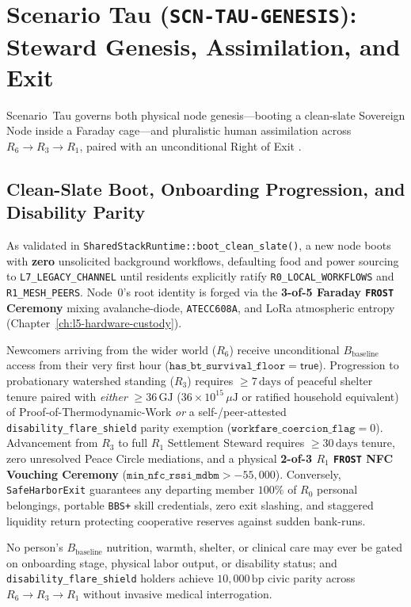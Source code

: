 \section{Scenario Tau (\texttt{SCN-TAU-GENESIS}): Steward Genesis, Assimilation, and Exit}
\label{sec:wavea-tau}

Scenario~Tau governs both physical node genesis---booting a clean-slate Sovereign Node inside a
Faraday cage---and pluralistic human assimilation across $R_6 \to R_3 \to R_1$, paired with an
unconditional Right of Exit \parencite{hirschman1970}.

\subsection{Clean-Slate Boot, Onboarding Progression, and Disability Parity}

As validated in \texttt{SharedStackRuntime::boot\_clean\_slate()}, a new node boots with
\textbf{zero} unsolicited background workflows, defaulting food and power sourcing to
\texttt{L7\_LEGACY\_CHANNEL} until residents explicitly ratify \texttt{R0\_LOCAL\_WORKFLOWS} and
\texttt{R1\_MESH\_PEERS}. Node~0's root identity is forged via the \textbf{3-of-5 Faraday \texttt{FROST}
Ceremony} mixing avalanche-diode, \texttt{ATECC608A}, and LoRa atmospheric entropy (Chapter~\ref{ch:l5-hardware-custody}).

Newcomers arriving from the wider world ($R_6$) receive unconditional $B_{\mathrm{baseline}}$ access
from their very first hour ($\mathtt{has\_bt\_survival\_floor} = \mathsf{true}$). Progression to
probationary watershed standing ($R_3$) requires $\ge 7\,\mathrm{days}$ of peaceful shelter tenure
paired with \textit{either} $\ge 36\,\mathrm{GJ}$ ($36 \times 10^{15}\,\mu\mathrm{J}$ or ratified
household equivalent) of Proof-of-Thermodynamic-Work \textit{or} a self-/peer-attested
\texttt{disability\_flare\_shield} parity exemption ($\mathtt{workfare\_coercion\_flag} = 0$).
Advancement from $R_3$ to full $R_1$ Settlement Steward requires $\ge 30\,\mathrm{days}$ tenure,
zero unresolved Peace Circle mediations, and a physical \textbf{2-of-3 $R_1$ \texttt{FROST} NFC Vouching
Ceremony} ($\mathtt{min\_nfc\_rssi\_mdbm} > -55{,}000$). Conversely, \texttt{SafeHarborExit}
guarantees any departing member $100\%$ of $R_0$ personal belongings, portable \texttt{BBS+} skill
credentials, zero exit slashing, and staggered liquidity return protecting cooperative reserves
against sudden bank-runs.

\begin{invariant}
\label{inv:wavea-tau-parity}
No person's $B_{\mathrm{baseline}}$ nutrition, warmth, shelter, or clinical care may ever be gated on
onboarding stage, physical labor output, or disability status; and \texttt{disability\_flare\_shield}
holders achieve $10{,}000\,\mathrm{bp}$ civic parity across $R_6 \to R_3 \to R_1$ without invasive
medical interrogation.
\end{invariant}

